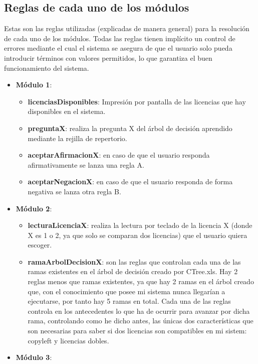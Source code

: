 \subsection{Reglas de cada uno de los módulos}

Estas son las reglas utilizadas (explicadas de manera general) para la resolución de cada uno de los módulos. Todas las reglas tienen implícito un control de errores mediante el cual el sistema se asegura de que el usuario solo pueda introducir términos con valores permitidos, lo que garantiza el buen funcionamiento del sistema.

\begin{itemize}
	\item \textbf{Módulo 1}:
		\begin{itemize}
			\item \textbf{licenciasDisponibles}: Impresión por pantalla de las licencias que hay disponibles en el sistema.
			\item \textbf{preguntaX}: realiza la pregunta X del árbol de decisión aprendido mediante la rejilla de repertorio.
			\item \textbf{aceptarAfirmacionX}: en caso de que el usuario responda afirmativamente se lanza una regla A.
			\item \textbf{aceptarNegacionX}: en caso de que el usuario responda de forma negativa se lanza otra regla B.
		\end{itemize}
	\item \textbf{Módulo 2}:
		\begin{itemize}
			\item \textbf{lecturaLicenciaX}: realiza la lectura por teclado de la licencia X (donde X es 1 o 2, ya que solo se comparan dos licencias) que el usuario quiera escoger.
			\item \textbf{ramaArbolDecisionX}: son las reglas que controlan cada una de las ramas existentes en el árbol de decisión creado por CTree.xls. Hay 2 reglas menos que ramas existentes, ya que hay 2 ramas en el árbol creado que, con el conocimiento que posee mi sistema nunca llegarían a ejecutarse, por tanto hay 5 ramas en total. Cada una de las reglas controla en los antecedentes lo que ha de ocurrir para avanzar por dicha rama, controlando como he dicho antes, las únicas dos características que son necesarias para saber si dos licencias son compatibles en mi sistem: copyleft y licencias dobles.
		\end{itemize}
	\item \textbf{Módulo 3}:
		\begin{itemize}

\end{itemize}
\end{itemize}
